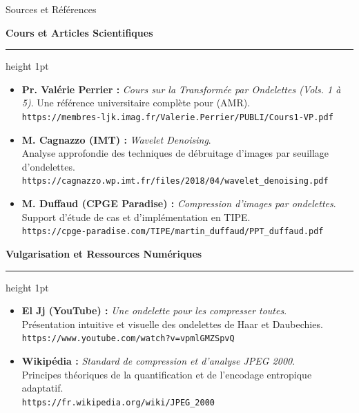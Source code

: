 \documentclass[10pt]{beamer}
\begin{document}
	\begin{frame}{Sources et Références}
		\vspace{-0.6em}
		
		{\large\bfseries\color{bleu} Cours et Articles Scientifiques}
		\nopagebreak
		\vspace{0.1em}
		{\color{bleumed}\hrule height 1pt}
		\vspace{0.4em}
		
		\begin{itemize}
			\item[\color{bleu}\blacktriangleright] \textbf{Pr. Valérie Perrier :} \emph{Cours sur la Transformée par Ondelettes (Vols. 1 à 5)}. Une référence universitaire complète pour (AMR).\\
			\footnotesize\texttt{https://membres-ljk.imag.fr/Valerie.Perrier/PUBLI/Cours1-VP.pdf} 
			
			\item[\color{bleu}\blacktriangleright] \textbf{M. Cagnazzo (IMT) :} \emph{Wavelet Denoising}. \\ Analyse approfondie des techniques de débruitage d'images par seuillage d'ondelettes.\\
			\footnotesize\texttt{https://cagnazzo.wp.imt.fr/files/2018/04/wavelet\_denoising.pdf}
			
			\item[\color{bleu}\blacktriangleright] \textbf{M. Duffaud (CPGE Paradise) :} \emph{Compression d'images par ondelettes}. \\ Support d'étude de cas et d'implémentation en TIPE.\\
			\footnotesize\texttt{https://cpge-paradise.com/TIPE/martin\_duffaud/PPT\_duffaud.pdf}
		\end{itemize}
		
		\vspace{0.8em}
		
		{\large\bfseries\color{bleu} Vulgarisation et Ressources Numériques}
		\nopagebreak
		\vspace{0.1em}
		{\color{bleumed}\hrule height 1pt}
		\vspace{0.4em}
		
		\begin{itemize}
			\item[\color{rouge}\blacktriangleright] \textbf{El Jj (YouTube) :} \emph{Une ondelette pour les compresser toutes}. \\Présentation intuitive et visuelle des ondelettes de Haar et Daubechies.\\
			\footnotesize\texttt{https://www.youtube.com/watch?v=vpmlGMZSpvQ}
			
			\item[\color{rouge}\blacktriangleright] \textbf{Wikipédia :} \emph{Standard de compression et d'analyse JPEG 2000}.\\ Principes théoriques de la quantification et de l'encodage entropique adaptatif.\\
			\footnotesize\texttt{https://fr.wikipedia.org/wiki/JPEG\_2000}
		\end{itemize}
	\end{frame}
	
\end{document}
